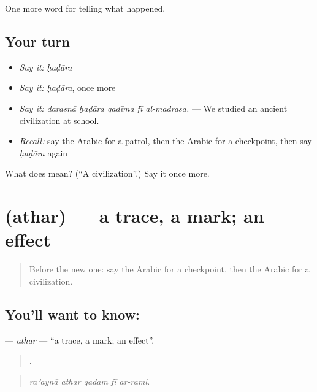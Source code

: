 \begin{grammarlens}[title={What you've built}]
One more word for telling what happened.
\end{grammarlens}

\subsection*{Your turn}
\begin{itemize}
\raggedright
  \item \emph{Say it:} \emph{ḥaḍāra}
  \item \emph{Say it:} \emph{ḥaḍāra}, once more
  \item \emph{Say it:} \emph{darasnā ḥaḍāra qadīma fī al-madrasa.} — We studied an ancient civilization at school.
  \item \emph{Recall:} say the Arabic for a patrol, then the Arabic for a checkpoint, then say \emph{ḥaḍāra} again
\end{itemize}

\begin{tcolorbox}[breakable,colback=teal!4,colframe=teal!35!black,title={Before you move on}]
What does  mean? (\textquotedblleft{}A civilization\textquotedblright{}.) Say it once more.
\end{tcolorbox}
\section[\texorpdfstring{\ar{أثر} (athar)}{أثر (athar)}]{ (athar) — a trace, a mark; an effect}

\label{lesson:AR-C318-athar}



\begin{quote}
Before the new one: say the Arabic for a checkpoint, then the Arabic for a civilization.
\end{quote}

\subsection*{You'll want to know: }
\textbf{} — \emph{athar} — \textquotedblleft{}a trace, a mark; an effect\textquotedblright{}.

\begin{quote}
    .
\end{quote}

\begin{quote}
\emph{raʾaynā athar qadam fī ar-raml.}
\end{quote}

